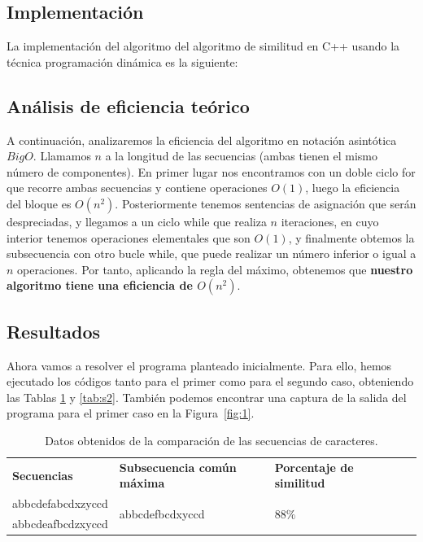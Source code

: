 \subsection{Implementación}

La implementación del algoritmo del algoritmo de similitud en C++ usando la técnica programación dinámica es la siguiente:





\subsection{Análisis de eficiencia teórico}

A continuación, analizaremos la eficiencia del algoritmo en notación asintótica $BigO$.
Llamamos $n$ a la longitud de las secuencias (ambas tienen el mismo número de componentes). En primer lugar nos encontramos con un doble ciclo for que recorre ambas
secuencias y contiene operaciones $O(1)$, luego la eficiencia del bloque es $O(n^{2})$.
Posteriormente tenemos sentencias de asignación que serán despreciadas, y llegamos a un
ciclo while que realiza $n$ iteraciones, en cuyo interior tenemos operaciones elementales que son $O(1)$, y finalmente obtemos la subsecuencia con otro bucle while, que puede realizar un número inferior o igual a $n$ operaciones. Por tanto, aplicando la regla del máximo, obtenemos que \textbf{nuestro algoritmo tiene una eficiencia de $O(n^{2})$}.
 

\subsection{Resultados}

Ahora vamos a resolver el programa planteado inicialmente. Para ello,
hemos ejecutado los códigos tanto para el primer como para el segundo caso,
obteniendo las Tablas \ref{tab:s1} y \ref{tab:s2}. También podemos encontrar
una captura de la salida del programa para el primer caso en la Figura~\ref{fig:1}. 

\begin{table}[h]
    \footnotesize
    \centering
	\begin{tabular}{|l|l|l|ll}
		\cline{1-3}
		\textbf{Secuencias}                           & \textbf{Subsecuencia común máxima}                       & \textbf{Porcentaje de similitud}     &  &  \\ \cline{1-3}
		abbcdefabcdxzyccd                    & \multirow{2}{*}{abbcdefbcdxyccd}                & \multirow{2}{*}{$88 \%$}    &  &  \\ \cline{1-1}
		abbcdeafbcdzxyccd                    &                                                 &                             &  &  \\ \cline{1-3}
	\end{tabular}
  \caption{Datos obtenidos de la comparación de las secuencias de caracteres.}
  \label{tab:s1}
\end{table}

